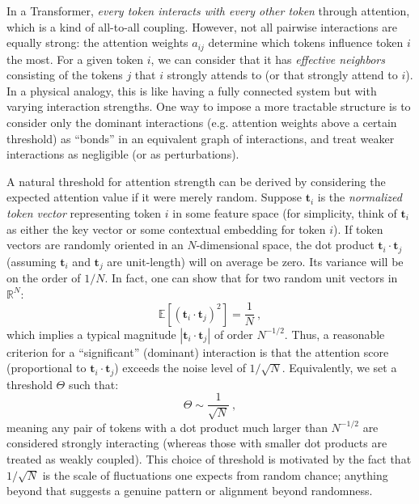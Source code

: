 \documentclass[12pt]{article}
\begin{document}
In a Transformer, \emph{every token interacts with every other token} through attention, which is a kind of all-to-all coupling. However, not all pairwise interactions are equally strong: the attention weights $a_{ij}$ determine which tokens influence token $i$ the most. For a given token $i$, we can consider that it has \emph{effective neighbors} consisting of the tokens $j$ that $i$ strongly attends to (or that strongly attend to $i$). In a physical analogy, this is like having a fully connected system but with varying interaction strengths. One way to impose a more tractable structure is to consider only the dominant interactions (e.g. attention weights above a certain threshold) as ``bonds'' in an equivalent graph of interactions, and treat weaker interactions as negligible (or as perturbations).

A natural threshold for attention strength can be derived by considering the expected attention value if it were merely random. Suppose $\mathbf{t}_i$ is the \emph{normalized token vector} representing token $i$ in some feature space (for simplicity, think of $\mathbf{t}_i$ as either the key vector or some contextual embedding for token $i$). If token vectors are randomly oriented in an $N$-dimensional space, the dot product $\mathbf{t}_i \cdot \mathbf{t}_j$ (assuming $\mathbf{t}_i$ and $\mathbf{t}_j$ are unit-length) will on average be zero. Its variance will be on the order of $1/N$. In fact, one can show that for two random unit vectors in $\mathbb{R}^N$:
\begin{equation}
\mathbb{E}\!\left[ (\mathbf{t}_i \cdot \mathbf{t}_j)^2 \right] = \frac{1}{N}~, 
\end{equation}
which implies a typical magnitude $|\mathbf{t}_i \cdot \mathbf{t}_j|$ of order $N^{-1/2}$. Thus, a reasonable criterion for a ``significant'' (dominant) interaction is that the attention score (proportional to $\mathbf{t}_i \cdot \mathbf{t}_j$) exceeds the noise level of $1/\sqrt{N}$. Equivalently, we set a threshold $\Theta$ such that:
\begin{equation}
\Theta \sim \frac{1}{\sqrt{N}}~,
\label{eq:threshold}
\end{equation}
meaning any pair of tokens with a dot product much larger than $N^{-1/2}$ are considered strongly interacting (whereas those with smaller dot products are treated as weakly coupled). This choice of threshold is motivated by the fact that $1/\sqrt{N}$ is the scale of fluctuations one expects from random chance; anything beyond that suggests a genuine pattern or alignment beyond randomness.
\end{document}
